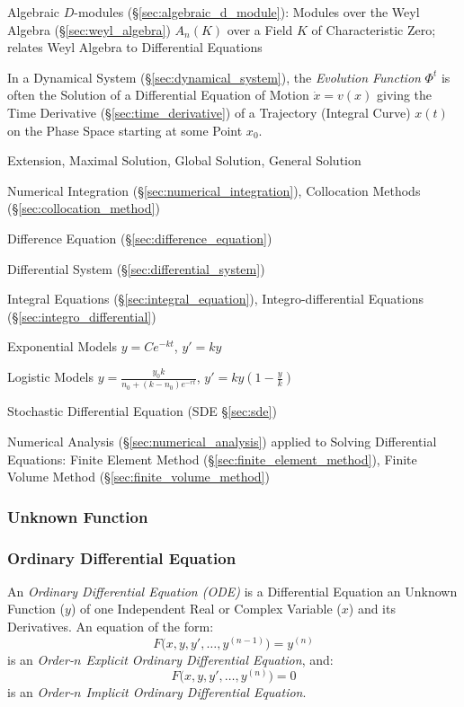 \fist Algebraic $D$-modules (\S\ref{sec:algebraic_d_module}): Modules over the
Weyl Algebra (\S\ref{sec:weyl_algebra}) $A_n(K)$ over a Field $K$ of
Characteristic Zero; relates Weyl Algebra to Differential Equations

In a Dynamical System (\S\ref{sec:dynamical_system}), the \emph{Evolution
  Function} $\Phi^t$ is often the Solution of a Differential Equation of Motion
$\dot{x} = v(x)$ giving the Time Derivative (\S\ref{sec:time_derivative}) of a
Trajectory (Integral Curve) $x(t)$ on the Phase Space starting at some Point
$x_0$.

Extension, Maximal Solution, Global Solution, General Solution

\fist Numerical Integration (\S\ref{sec:numerical_integration}), Collocation
Methods (\S\ref{sec:collocation_method})

\fist Difference Equation (\S\ref{sec:difference_equation})

\fist Differential System (\S\ref{sec:differential_system})

\fist Integral Equations (\S\ref{sec:integral_equation}), Integro-differential
Equations (\S\ref{sec:integro_differential})

Exponential Models $y = Ce^{-kt}$, $y' = ky$

Logistic Models $y = \frac{y_0 k}{n_0 + (k-n_0)e^{-rt}}$,
  $y' = ky (1 - \frac{y}{k})$

\fist Stochastic Differential Equation (SDE \S\ref{sec:sde})

\fist Numerical Analysis (\S\ref{sec:numerical_analysis}) applied to Solving
Differential Equations: Finite Element Method
(\S\ref{sec:finite_element_method}), Finite Volume Method
(\S\ref{sec:finite_volume_method})



\subsubsection{Unknown Function}\label{sec:unknown_function}

\subsubsection{Ordinary Differential Equation}\label{sec:ode}

An \emph{Ordinary Differential Equation (ODE)} is a Differential Equation an
Unknown Function ($y$) of one Independent Real or Complex Variable ($x$) and its
Derivatives. An equation of the form:
\[
  F\Big(x,y,y',\ldots,y^{(n-1)}\Big) = y^{(n)}
\]
is an \emph{Order-$n$ Explicit Ordinary Differential Equation}, and:
\[
  F\Big(x,y,y',\ldots,y^{(n)}\Big) = 0
\]
is an \emph{Order-$n$ Implicit Ordinary Differential Equation}.

